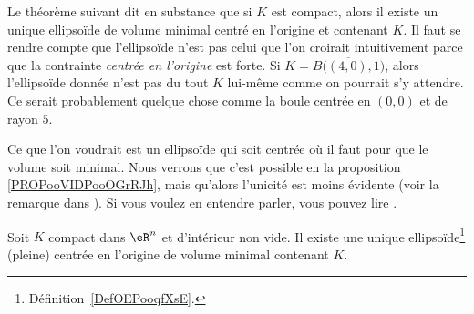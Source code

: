 \begin{normaltext}
    Le théorème suivant dit en substance que si \( K\) est compact, alors il existe un unique ellipsoïde de volume minimal centré en l'origine et contenant \( K\). Il faut se rendre compte que l'ellipsoïde n'est pas celui que l'on croirait intuitivement parce que la contrainte \emph{centrée en l'origine} est forte. Si \( K=\overline{ B\big( (4,0), 1 \big) }\), alors l'ellipsoïde donnée n'est pas du tout \( K\) lui-même comme on pourrait s'y attendre. Ce serait probablement quelque chose comme la boule centrée en \( (0,0)\) et de rayon \( 5\).

    Ce que l'on voudrait est un ellipsoïde qui soit centrée où il faut pour que le volume soit minimal. Nous verrons que c'est possible en la proposition \ref{PROPooVIDPooOGrRJh}, mais qu'alors l'unicité est moins évidente (voir la remarque dans \cite{ooJWHFooGQQhUW}). Si vous voulez en entendre parler, vous pouvez lire \cite{ooASOAooNwZFKS,ooWLGRooFScSaM}.
\end{normaltext}

\begin{proposition}   \label{PropJYVooRMaPok}
    Soit \( K\) compact dans \( \eR^n\) et d'intérieur non vide. Il existe une unique ellipsoïde\footnote{Définition~\ref{DefOEPooqfXsE}.} (pleine) centrée en l'origine de volume minimal contenant \( K\).
\end{proposition}

